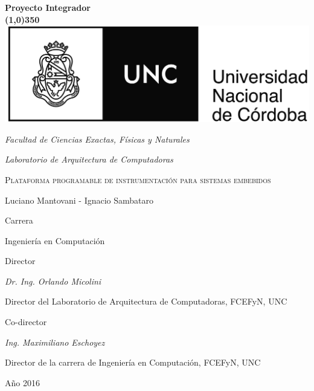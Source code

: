 \documentclass[a4paper]{report}
\date{}
\begin{document}
\begin{titlepage}
    \centering
    \textbf{\huge{Proyecto Integrador} \\ \line(1,0){350}} \\
    \vspace{0.5cm}\includegraphics[scale=0.53]{Escudo.jpg}\\
    \vspace{0.15cm}
    {\large\itshape Facultad de Ciencias Exactas, Físicas y Naturales\par}
    \vspace{0.15cm}
    {\large\itshape Laboratorio de Arquitectura de Computadoras\par}
    \vspace{1cm}
    {\scshape\Huge Plataforma programable de instrumentación para sistemas embebidos\par}
    \vspace{1cm}
    {\Large Luciano Mantovani - Ignacio Sambataro\par}
    \vspace{1.5cm}
    {\large Carrera\par}
    \vspace{0.10cm}
    {\large Ingeniería en Computación\par}
    \vspace{1cm}
    {\large Director\par}
    \vspace{0.10cm}
    {\large\itshape Dr. Ing. Orlando Micolini\par}
    {Director del Laboratorio de Arquitectura de Computadoras, FCEFyN, UNC\par}
    \vspace{1cm}
    {\large Co-director\par}
    \vspace{0.10cm}
    {\large\itshape Ing. Maximiliano Eschoyez\par}
    {Director de la carrera de Ingeniería en Computación, FCEFyN, UNC\par}

    \vfill

    {\large Año 2016 \par}
\end{titlepage}
\end{document}
